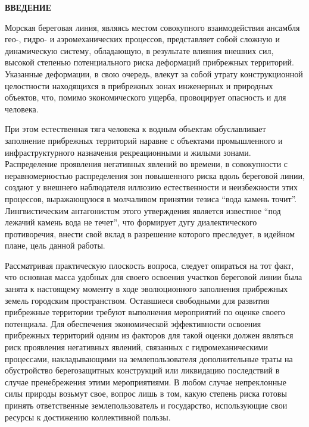 \newpage
\begin{center}
  \textbf{ВВЕДЕНИЕ}
\end{center}

Морская береговая линия, являясь местом совокупного взаимодействия ансамбля гео-, гидро- и аэромеханических процессов, представляет собой сложную и динамическую систему, обладающую, в результате влияния внешних сил, высокой степенью потенциального риска деформаций прибрежных территорий.
Указанные деформации, в свою очередь, влекут за собой утрату конструкционной целостности находящихся в прибрежных зонах инженерных и природных объектов, что, помимо экономического ущерба, провоцирует опасность и для человека.

При этом естественная тяга человека к водным объектам обуславливает заполнение прибрежных территорий наравне с объектами промышленного и инфраструктурного назначения рекреационными и жилыми зонами.
Распределение проявления негативных явлений во времени, в совокупности с неравномерностью распределения зон повышенного риска вдоль береговой линии, создают у внешнего наблюдателя иллюзию естественности и неизбежности этих процессов, выражающуюся в молчаливом принятии тезиса \enquote{вода камень точит}.
Лингвистическим антагонистом этого утверждения является известное \enquote{под лежачий камень вода не течет}, что формирует дугу диалектического противоречия, внести свой вклад в разрешение которого преследует, в идейном плане, цель данной работы.

Рассматривая практическую плоскость вопроса, следует опираться на тот факт, что основная масса удобных для своего освоения участков береговой линии была занята к настоящему моменту в ходе эволюционного заполнения прибрежных земель городским пространством.
Оставшиеся свободными для развития прибрежные территории требуют выполнения мероприятий по оценке своего потенциала.
Для обеспечения экономической эффективности освоения прибрежных территорий одним из факторов для такой оценки должен являться риск проявления негативных явлений, связанных с гидромеханическими процессами, накладывающими на землепользователя дополнительные траты на обустройство берегозащитных конструкций или ликвидацию последствий в случае пренебрежения этими мероприятиями.
В любом случае непреклонные силы природы возьмут свое, вопрос лишь в том, какую степень риска готовы принять ответственные землепользователь и государство, использующие свои ресурсы к достижению коллективной пользы.

